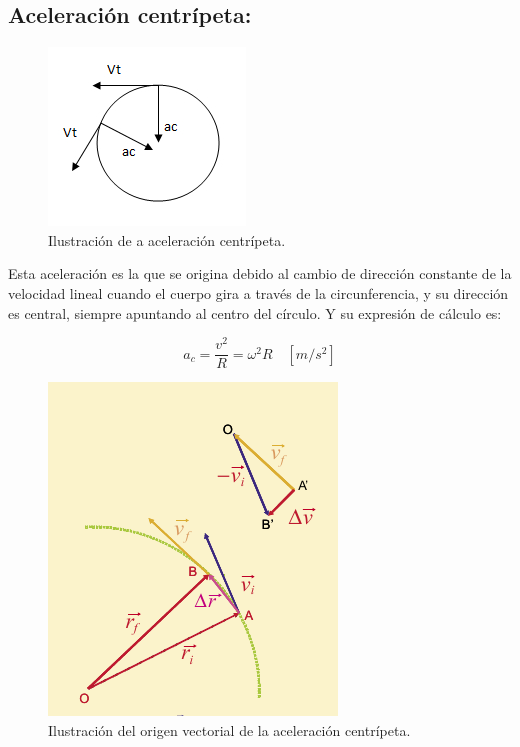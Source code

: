 \subsection{Aceleración centrípeta:}

\begin{figure}[ht]
 \centering
 \includegraphics[scale=0.6]{images/aceleracion-centripeta.jpg}
 \caption{Ilustración de a aceleración centrípeta.}\label{ac}
\end{figure}

Esta aceleración es la que se origina debido al cambio de dirección constante de la velocidad lineal cuando el cuerpo gira a 
través de la circunferencia, y su dirección es central, siempre apuntando al centro del círculo. Y su expresión de cálculo es:

\begin{equation}
a_c = \frac{v^2}{R} =  \omega^2 R\quad [m/s^2]
\end{equation}

\begin{figure}[ht]
 \centering
 \includegraphics[scale=0.6]{images/acentripeta.png}
 \caption{Ilustración del origen vectorial de la aceleración centrípeta.}\label{ac}
\end{figure} 

